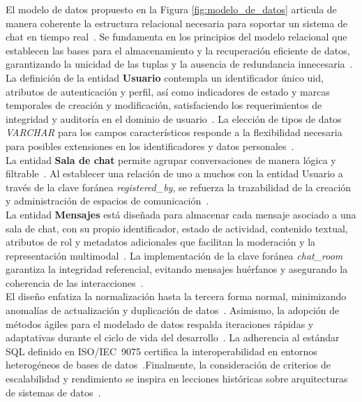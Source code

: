 El modelo de datos propuesto en la Figura \ref{fig:modelo_de_datos} articula de manera coherente la estructura relacional necesaria para soportar un sistema de chat en tiempo real~\cite{Codd1970}. Se fundamenta en los principios del modelo relacional que establecen las bases para el almacenamiento y la recuperación eficiente de datos, garantizando la unicidad de las tuplas y la ausencia de redundancia innecesaria~\cite{Silberschatz2019}.\\
La definición de la entidad \textbf{Usuario} contempla un identificador único uid, atributos de autenticación y perfil, así como indicadores de estado y marcas temporales de creación y modificación, satisfaciendo los requerimientos de integridad y auditoría en el dominio de usuario~\cite{ElmasriNavathe2010}. La elección de tipos de datos \textit{VARCHAR} para los campos característicos responde a la flexibilidad necesaria para posibles extensiones en los identificadores y datos personales~\cite{Date2003}.\\
La entidad \textbf{Sala de chat} permite agrupar conversaciones de manera lógica y filtrable~\cite{ConnollyBegg2014}. Al establecer una relación de uno a muchos con la entidad Usuario a través de la clave foránea \textit{registered\_by}, se refuerza la trazabilidad de la creación y administración de espacios de comunicación~\cite{Harrington2015}.\\
La entidad \textbf{Mensajes} está diseñada para almacenar cada mensaje asociado a una sala de chat, con su propio identificador, estado de actividad, contenido textual, atributos de rol y metadatos adicionales que facilitan la moderación y la representación multimodal~\cite{Silberschatz2019}. La implementación de la clave foránea \textit{chat\_room} garantiza la integridad referencial, evitando mensajes huérfanos y asegurando la coherencia de las interacciones~\cite{IBMReferential}.\\
El diseño enfatiza la normalización hasta la tercera forma normal, minimizando anomalías de actualización y duplicación de datos~\cite{Silberschatz2019}. Asimismo, la adopción de métodos ágiles para el modelado de datos respalda iteraciones rápidas y adaptativas durante el ciclo de vida del desarrollo~\cite{Ambler2003}. La adherencia al estándar SQL definido en ISO/IEC 9075 certifica la interoperabilidad en entornos heterogéneos de bases de datos~\cite{ISO9075}.Finalmente, la consideración de criterios de escalabilidad y rendimiento se inspira en lecciones históricas sobre arquitecturas de sistemas de datos~\cite{Stonebraker2005}.


